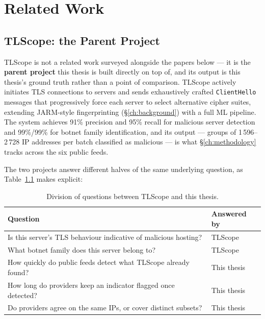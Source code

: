 \documentclass[12pt, a4paper, twoside]{report}
\begin{document}
\chapter{Related Work}
\label{ch:related_work}

\section{TLScope: the Parent Project}

TLScope \cite{theofanous2024tlscope} is not a related work surveyed alongside the papers below ---
it is the \textbf{parent project} this thesis is built directly on top of, and its output is this
thesis's ground truth rather than a point of comparison. TLScope actively initiates TLS connections
to servers and sends exhaustively crafted \texttt{ClientHello} messages that progressively force
each server to select alternative cipher suites, extending JARM-style fingerprinting
(\S\ref{ch:background}) with a full ML pipeline. The system achieves 91\% precision and 95\% recall
for malicious server detection and 99\%/99\% for botnet family identification, and its output ---
groups of 1\,596--2\,728 IP addresses per batch classified as malicious --- is what
\S\ref{ch:methodology} tracks across the six public feeds.

The two projects answer different halves of the same underlying question, as
Table~\ref{tab:tlscope_netscan} makes explicit:

\begin{table}[h]
  \centering
  \caption{Division of questions between TLScope and this thesis.}
  \label{tab:tlscope_netscan}
  \begin{tabularx}{\linewidth}{Xl}
    \toprule
    \textbf{Question} & \textbf{Answered by} \\
    \midrule
    Is this server's TLS behaviour indicative of malicious hosting? & TLScope \\
    What botnet family does this server belong to?                 & TLScope \\
    How quickly do public feeds detect what TLScope already found?  & This thesis \\
    How long do providers keep an indicator flagged once detected?  & This thesis \\
    Do providers agree on the same IPs, or cover distinct subsets?  & This thesis \\
    \bottomrule
  \end{tabularx}
\end{table}
\end{document}

